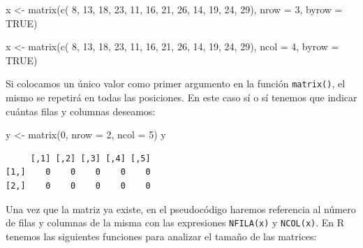 \documentclass[
]{book}
\newenvironment{Shaded}{\begin{snugshade}}{\end{snugshade}}
\newcommand{\AttributeTok}[1]{\textcolor[rgb]{0.77,0.63,0.00}{#1}}
\newcommand{\ConstantTok}[1]{\textcolor[rgb]{0.00,0.00,0.00}{#1}}
\newcommand{\DecValTok}[1]{\textcolor[rgb]{0.00,0.00,0.81}{#1}}
\newcommand{\FunctionTok}[1]{\textcolor[rgb]{0.00,0.00,0.00}{#1}}
\newcommand{\NormalTok}[1]{#1}
\newcommand{\OtherTok}[1]{\textcolor[rgb]{0.56,0.35,0.01}{#1}}
\begin{document}
\begin{Shaded}
\begin{Highlighting}[]
\NormalTok{x }\OtherTok{\textless{}{-}} \FunctionTok{matrix}\NormalTok{(}\FunctionTok{c}\NormalTok{( }\DecValTok{8}\NormalTok{, }\DecValTok{13}\NormalTok{, }\DecValTok{18}\NormalTok{, }\DecValTok{23}\NormalTok{, }
              \DecValTok{11}\NormalTok{, }\DecValTok{16}\NormalTok{, }\DecValTok{21}\NormalTok{, }\DecValTok{26}\NormalTok{, }
              \DecValTok{14}\NormalTok{, }\DecValTok{19}\NormalTok{, }\DecValTok{24}\NormalTok{, }\DecValTok{29}\NormalTok{), }
            \AttributeTok{nrow =} \DecValTok{3}\NormalTok{, }\AttributeTok{byrow =} \ConstantTok{TRUE}\NormalTok{)}

\NormalTok{x }\OtherTok{\textless{}{-}} \FunctionTok{matrix}\NormalTok{(}\FunctionTok{c}\NormalTok{( }\DecValTok{8}\NormalTok{, }\DecValTok{13}\NormalTok{, }\DecValTok{18}\NormalTok{, }\DecValTok{23}\NormalTok{, }
              \DecValTok{11}\NormalTok{, }\DecValTok{16}\NormalTok{, }\DecValTok{21}\NormalTok{, }\DecValTok{26}\NormalTok{, }
              \DecValTok{14}\NormalTok{, }\DecValTok{19}\NormalTok{, }\DecValTok{24}\NormalTok{, }\DecValTok{29}\NormalTok{), }
            \AttributeTok{ncol =} \DecValTok{4}\NormalTok{, }\AttributeTok{byrow =} \ConstantTok{TRUE}\NormalTok{)}
\end{Highlighting}
\end{Shaded}

Si colocamos un único valor como primer argumento en la función \texttt{matrix()}, el mismo se repetirá en todas las posiciones. En este caso sí o sí tenemos que indicar cuántas filas y columnas deseamos:

\begin{Shaded}
\begin{Highlighting}[]
\NormalTok{y }\OtherTok{\textless{}{-}} \FunctionTok{matrix}\NormalTok{(}\DecValTok{0}\NormalTok{, }\AttributeTok{nrow =} \DecValTok{2}\NormalTok{, }\AttributeTok{ncol =} \DecValTok{5}\NormalTok{)}
\NormalTok{y}
\end{Highlighting}
\end{Shaded}

\begin{verbatim}
     [,1] [,2] [,3] [,4] [,5]
[1,]    0    0    0    0    0
[2,]    0    0    0    0    0
\end{verbatim}

Una vez que la matriz ya existe, en el pseudocódigo haremos referencia al número de filas y columnas de la misma con las expresiones \texttt{NFILA(x)} y \texttt{NCOL(x)}. En R tenemos las siguientes funciones para analizar el tamaño de las matrices:
\end{document}
